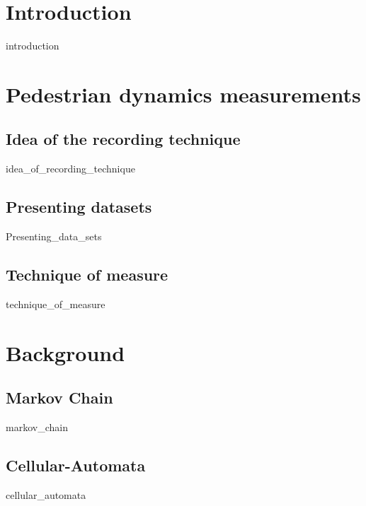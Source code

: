 \documentclass[10pt,a4paper]{report}
\begin{document}

\begin{abstract}
	{abstract}
\end{abstract}



\tableofcontents



\chapter{Introduction}

	{introduction}


\chapter{Pedestrian dynamics measurements}

\section{Idea of the recording technique}
	{idea_of_recording_technique}

\section{Presenting datasets}
	{Presenting_data_sets}

\section{Technique of measure}
	{technique_of_measure}



\chapter{Background}

\section{Markov Chain}
	{markov_chain}

\section{Cellular-Automata}
	{cellular_automata}
\end{document}
